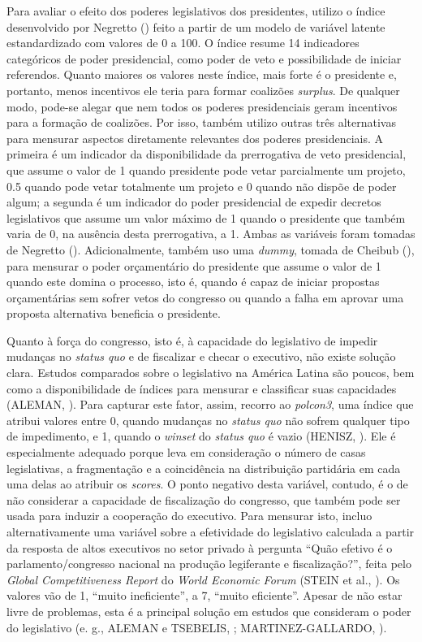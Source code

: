 Para avaliar o efeito dos poderes legislativos dos presidentes, utilizo o índice desenvolvido por Negretto (\citeyear{negretto2013}) feito a partir de um modelo de variável latente estandardizado com valores de 0 a 100. O índice resume 14 indicadores categóricos de poder presidencial, como poder de veto e possibilidade de iniciar referendos. Quanto maiores os valores neste índice, mais forte é o presidente e, portanto, menos incentivos ele teria para formar coalizões \textit{surplus}. De qualquer modo, pode-se alegar que nem todos os poderes presidenciais geram incentivos para a formação de coalizões. Por isso, também utilizo outras três alternativas para mensurar aspectos diretamente relevantes dos poderes presidenciais. A primeira é um indicador da disponibilidade da prerrogativa de veto presidencial, que assume o valor de 1 quando presidente pode vetar parcialmente um projeto, 0.5 quando pode vetar totalmente um projeto e 0 quando não dispõe de poder algum; a segunda é um indicador do poder presidencial de expedir decretos legislativos que assume um valor máximo de 1 quando o presidente que também varia de 0, na ausência desta prerrogativa, a 1. Ambas as variáveis foram tomadas de Negretto (\citeyear{negretto2013}). Adicionalmente, também uso uma \textit{dummy}, tomada de Cheibub (\citeyear{cheibub2007}), para mensurar o poder orçamentário do presidente que assume o valor de 1 quando este domina o processo, isto é, quando é capaz de iniciar propostas orçamentárias sem sofrer vetos do congresso ou quando a falha em aprovar uma proposta alternativa beneficia o presidente.

Quanto à força do congresso, isto é, à capacidade do legislativo de impedir mudanças no \textit{status quo} e de fiscalizar e checar o executivo, não existe solução clara. Estudos comparados sobre o legislativo na América Latina são poucos, bem como a disponibilidade de índices para mensurar e classificar suas capacidades (ALEMAN, \citeyear{aleman2013}). Para capturar este fator, assim, recorro ao \textit{polcon3}, uma índice que atribui valores entre 0, quando mudanças no \textit{status quo} não sofrem qualquer tipo de impedimento, e  1, quando o \textit{winset} do \textit{status quo} é vazio (HENISZ, \citeyear{henisz2002}). Ele é especialmente adequado porque leva em consideração o número de casas legislativas, a fragmentação e a coincidência na distribuição partidária em cada uma delas ao atribuir os \textit{scores}. O ponto negativo desta variável, contudo, é o de não considerar a capacidade de fiscalização do congresso, que também pode ser usada para induzir a cooperação do executivo. Para mensurar isto, incluo alternativamente uma variável sobre a efetividade do legislativo calculada a partir da resposta de altos executivos no setor privado à pergunta “Quão efetivo é o parlamento/congresso nacional na produção legiferante e fiscalização?”, feita pelo \textit{Global Competitiveness Report} do \textit{World Economic Forum} (STEIN et al., \citeyear{stein2006}). Os valores vão de 1, “muito ineficiente”, a 7, “muito eficiente”. Apesar de não estar livre de problemas, esta é a principal solução em estudos que consideram o poder do legislativo (e. g., ALEMAN e TSEBELIS, \citeyear{aleman2011}; MARTINEZ-GALLARDO, \citeyear{martinez2012}). 

